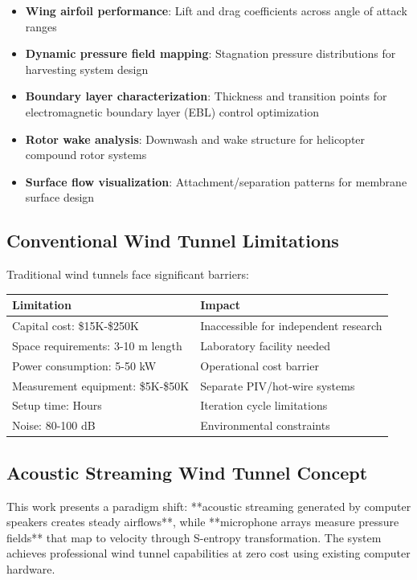 \documentclass[12pt,a4paper]{article}
\begin{document}
\begin{itemize}
\item \textbf{Wing airfoil performance}: Lift and drag coefficients across angle of attack ranges
\item \textbf{Dynamic pressure field mapping}: Stagnation pressure distributions for harvesting system design
\item \textbf{Boundary layer characterization}: Thickness and transition points for electromagnetic boundary layer (EBL) control optimization
\item \textbf{Rotor wake analysis}: Downwash and wake structure for helicopter compound rotor systems
\item \textbf{Surface flow visualization}: Attachment/separation patterns for membrane surface design
\end{itemize}

\subsection{Conventional Wind Tunnel Limitations}

Traditional wind tunnels face significant barriers:

\begin{center}
\begin{tabular}{|l|l|}
\hline
\textbf{Limitation} & \textbf{Impact} \\
\hline
Capital cost: \$15K-\$250K & Inaccessible for independent research \\
Space requirements: 3-10 m length & Laboratory facility needed \\
Power consumption: 5-50 kW & Operational cost barrier \\
Measurement equipment: \$5K-\$50K & Separate PIV/hot-wire systems \\
Setup time: Hours & Iteration cycle limitations \\
Noise: 80-100 dB & Environmental constraints \\
\hline
\end{tabular}
\end{center}

\subsection{Acoustic Streaming Wind Tunnel Concept}

This work presents a paradigm shift: **acoustic streaming generated by computer speakers creates steady airflows**, while **microphone arrays measure pressure fields** that map to velocity through S-entropy transformation. The system achieves professional wind tunnel capabilities at zero cost using existing computer hardware.
\end{document}
